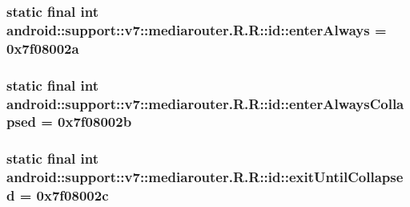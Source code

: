 \hypertarget{classandroid_1_1support_1_1v7_1_1mediarouter_1_1_r_1_1id_44cd9390ad9250fec5f8cff6f578965c}{
\subsubsection[{enterAlways}]{\setlength{\rightskip}{0pt plus 5cm}static final int android::support::v7::mediarouter.R.R::id::enterAlways = 0x7f08002a}}
\label{classandroid_1_1support_1_1v7_1_1mediarouter_1_1_r_1_1id_44cd9390ad9250fec5f8cff6f578965c}


\hypertarget{classandroid_1_1support_1_1v7_1_1mediarouter_1_1_r_1_1id_fe22f0fd72b3acb97d1e8b11410270a6}{
\subsubsection[{enterAlwaysCollapsed}]{\setlength{\rightskip}{0pt plus 5cm}static final int android::support::v7::mediarouter.R.R::id::enterAlwaysCollapsed = 0x7f08002b}}
\label{classandroid_1_1support_1_1v7_1_1mediarouter_1_1_r_1_1id_fe22f0fd72b3acb97d1e8b11410270a6}


\hypertarget{classandroid_1_1support_1_1v7_1_1mediarouter_1_1_r_1_1id_d8b8301174d22814ddd2061beee8d619}{
\subsubsection[{exitUntilCollapsed}]{\setlength{\rightskip}{0pt plus 5cm}static final int android::support::v7::mediarouter.R.R::id::exitUntilCollapsed = 0x7f08002c}}
\label{classandroid_1_1support_1_1v7_1_1mediarouter_1_1_r_1_1id_d8b8301174d22814ddd2061beee8d619}


